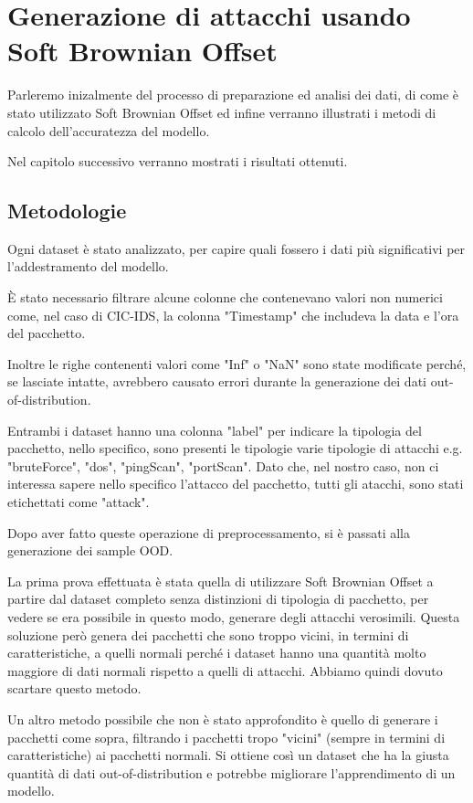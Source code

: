 \chapter{Generazione di attacchi usando Soft Brownian Offset}

Parleremo inizalmente del processo di preparazione ed analisi dei dati, di come è stato utilizzato Soft Brownian Offset ed infine verranno illustrati i metodi di calcolo dell'accuratezza del modello.

Nel capitolo successivo verranno mostrati i risultati ottenuti.


\section{Metodologie}

Ogni dataset è stato analizzato, per capire quali fossero i dati più significativi per l'addestramento del modello. 

È stato necessario filtrare alcune colonne che contenevano valori non numerici come, nel caso di CIC-IDS, la colonna "Timestamp" che includeva la data e l'ora del pacchetto. 

Inoltre le righe contenenti valori come "Inf" o "NaN" sono state modificate perché, se lasciate intatte, avrebbero causato errori durante la generazione dei dati out-of-distribution.

Entrambi i dataset hanno una colonna "label" per indicare la tipologia del pacchetto, nello specifico, sono presenti le tipologie varie tipologie di attacchi e.g. "bruteForce", "dos", "pingScan", "portScan". Dato che, nel nostro caso, non ci interessa sapere nello specifico l'attacco del pacchetto, tutti gli atacchi, sono stati etichettati come "attack".

Dopo aver fatto queste operazione di preprocessamento, si è passati alla generazione dei sample OOD.

La prima prova effettuata è stata quella di utilizzare Soft Brownian Offset a partire dal dataset completo senza distinzioni di tipologia di pacchetto, per vedere se era possibile in questo modo, generare degli attacchi verosimili. Questa soluzione però genera dei pacchetti che sono troppo vicini, in termini di caratteristiche, a quelli normali perché i dataset hanno una quantità molto maggiore di dati normali rispetto a quelli di attacchi. Abbiamo quindi dovuto scartare questo metodo.

Un altro metodo possibile che non è stato approfondito è quello di generare i pacchetti come sopra, filtrando i pacchetti tropo "vicini" (sempre in termini di caratteristiche) ai pacchetti normali. Si ottiene così un dataset che ha la giusta quantità di dati out-of-distribution e potrebbe migliorare l'apprendimento di un modello.

